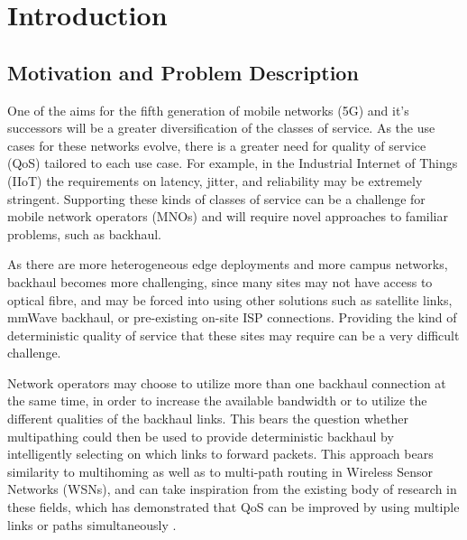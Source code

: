 
\cleardoublepage
\chapter{Introduction}

\label{cha:introduction}

\section{Motivation and Problem Description}
\label{sec:motivation}

One of the aims for the fifth generation of mobile networks (5G) and it's successors will be a greater diversification of the classes of service. As the use cases for these networks evolve, there is a greater need for quality of service (QoS) tailored to each use case. For example, in the Industrial Internet of Things (IIoT) the requirements on latency, jitter, and reliability may be extremely stringent. Supporting these kinds of classes of service can be a challenge for mobile network operators (MNOs) and will require novel approaches to familiar problems, such as backhaul.

As there are more heterogeneous edge deployments and more campus networks, backhaul becomes more challenging, since many sites may not have access to optical fibre, and may be forced into using other solutions such as satellite links, mmWave backhaul, or pre-existing on-site ISP connections. Providing the kind of deterministic quality of service that these sites may require can be a very difficult challenge.

Network operators may choose to utilize more than one backhaul connection at the same time, in order to increase the available bandwidth or to utilize the different qualities of the backhaul links. This bears the question whether multipathing could then be used to provide deterministic backhaul by intelligently selecting on which links to forward packets. This approach bears similarity to multihoming as well as to multi-path routing in Wireless Sensor Networks (WSNs), and can take inspiration from the existing body of research in these fields, which has demonstrated that QoS can be improved by using multiple links or paths simultaneously \cite{akella2003measurement, tao2005improving, habib2007improving, goldenberg2004optimizing, huang2008multiconstrained, akella2008performance}.



